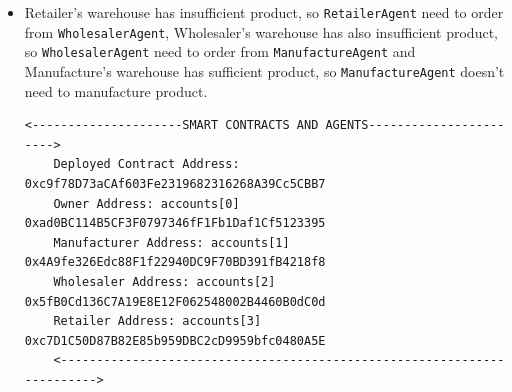 \begin{itemize}
    \vspace{.5cm}

    \item Retailer's warehouse has insufficient product, so \texttt{RetailerAgent} need to order from \texttt{WholesalerAgent}, Wholesaler's warehouse has also insufficient product, so \texttt{WholesalerAgent} need to order from \texttt{ManufactureAgent} and Manufacture's warehouse has sufficient product, so \texttt{ManufactureAgent} doesn't need to manufacture product.

    \vspace{.5cm}
    \begin{lstlisting}[numbers=none, basicstyle=\ttfamily\tiny]
    <---------------------SMART CONTRACTS AND AGENTS----------------------->
    Deployed Contract Address: 0xc9f78D73aCAf603Fe2319682316268A39Cc5CBB7
    Owner Address: accounts[0] 0xad0BC114B5CF3F0797346fF1Fb1Daf1Cf5123395
    Manufacturer Address: accounts[1] 0x4A9fe326Edc88F1f22940DC9F70BD391fB4218f8
    Wholesaler Address: accounts[2] 0x5fB0Cd136C7A19E8E12F062548002B4460B0dC0d
    Retailer Address: accounts[3] 0xc7D1C50D87B82E85b959DBC2cD9959bfc0480A5E
    <------------------------------------------------------------------------>
    

\end{lstlisting}
\end{itemize}
